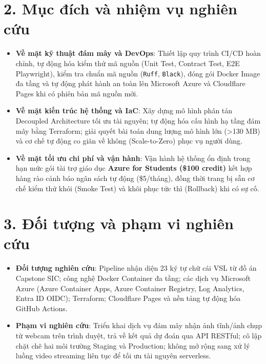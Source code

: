 \section*{2. Mục đích và nhiệm vụ nghiên cứu}
\begin{itemize}
    \item \textbf{Về mặt kỹ thuật đám mây và DevOps}: Thiết lập quy trình CI/CD hoàn chỉnh, tự động hóa kiểm thử mã nguồn (Unit Test, Contract Test, E2E Playwright), kiểm tra chuẩn mã nguồn (\texttt{Ruff}, \texttt{Black}), đóng gói Docker Image đa tầng và tự động phát hành an toàn lên Microsoft Azure và Cloudflare Pages khi có phiên bản mã nguồn mới.
    \item \textbf{Về mặt kiến trúc hệ thống và IaC}: Xây dựng mô hình phân tán Decoupled Architecture tối ưu tài nguyên; tự động hóa cấu hình hạ tầng đám mây bằng Terraform; giải quyết bài toán dung lượng mô hình lớn (>130 MB) và cơ chế tự động co giãn về không (Scale-to-Zero) phục vụ người dùng.
    \item \textbf{Về mặt tối ưu chi phí và vận hành}: Vận hành hệ thống ổn định trong hạn mức gói tài trợ giáo dục \textbf{Azure for Students (\$100 credit)} kết hợp hàng rào cảnh báo ngân sách tự động (\$5/tháng), đồng thời trang bị sẵn cơ chế kiểm thử khói (Smoke Test) và khôi phục tức thì (Rollback) khi có sự cố.
\end{itemize}

\section*{3. Đối tượng và phạm vi nghiên cứu}
\begin{itemize}
    \item \textbf{Đối tượng nghiên cứu}: Pipeline nhận diện 23 ký tự chữ cái VSL từ đồ án Capstone SIC; công nghệ Docker Container đa tầng; các dịch vụ Microsoft Azure (Azure Container Apps, Azure Container Registry, Log Analytics, Entra ID OIDC); Terraform; Cloudflare Pages và nền tảng tự động hóa GitHub Actions.
    \item \textbf{Phạm vi nghiên cứu}: Triển khai dịch vụ đám mây nhận ảnh tĩnh/ảnh chụp từ webcam trên trình duyệt, trả về kết quả dự đoán qua API RESTful; cô lập chặt chẽ hai môi trường Staging và Production; không mở rộng sang xử lý luồng video streaming liên tục để tối ưu tài nguyên serverless.
\end{itemize}

